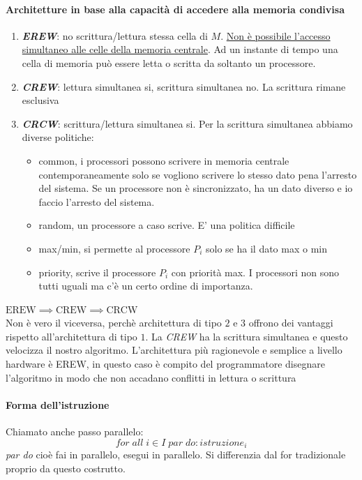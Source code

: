 \paragraph{Architetture in base alla capacità di accedere alla memoria condivisa}
\begin{enumerate}
    \item \textbf{\textit{EREW}}: no scrittura/lettura stessa cella di $M$. \uline{Non è possibile l'accesso simultaneo alle celle della memoria centrale}. Ad un instante di tempo una cella di memoria può essere letta o scritta da soltanto un processore.
    \item \textbf{\textit{CREW}}: lettura simultanea si, scrittura simultanea no. La scrittura rimane esclusiva
    \item \textbf{\textit{CRCW}}: scrittura/lettura simultanea si. Per la scrittura simultanea abbiamo diverse politiche:
    \begin{itemize}
        \item common, i processori possono scrivere in memoria centrale contemporaneamente solo se vogliono scrivere lo stesso dato pena l'arresto del sistema. Se un processore non è sincronizzato, ha un dato diverso e io faccio l'arresto del sistema.
        \item random, un processore a caso scrive. E' una politica difficile
        \item max/min, si permette al processore $P_i$ solo se ha il dato max o min
        \item priority, scrive il processore $P_i$ con priorità max. I processori non sono tutti uguali ma c'è un certo ordine di importanza. 
    \end{itemize} 
\end{enumerate}

\begin{osservazione}
$\text{EREW} \implies \text{CREW} \implies \text{CRCW}$\\
Non è vero il viceversa, perchè architettura di tipo $2$ e $3$ offrono dei vantaggi rispetto all'architettura di tipo $1$. La \textit{CREW} ha la scrittura simultanea e questo velocizza il nostro algoritmo. L'architettura più ragionevole e semplice a livello hardware è EREW, in questo caso è compito del programmatore disegnare l’algoritmo in modo che non accadano conflitti in lettura o scrittura
\end{osservazione} 

\paragraph{Forma dell'istruzione}
Chiamato anche passo parallelo:
$$for\;all\; i \in I\;par\;do: istruzione_i$$
\textit{par do} cioè fai in parallelo, esegui in parallelo. Si differenzia dal for tradizionale proprio da questo costrutto.

